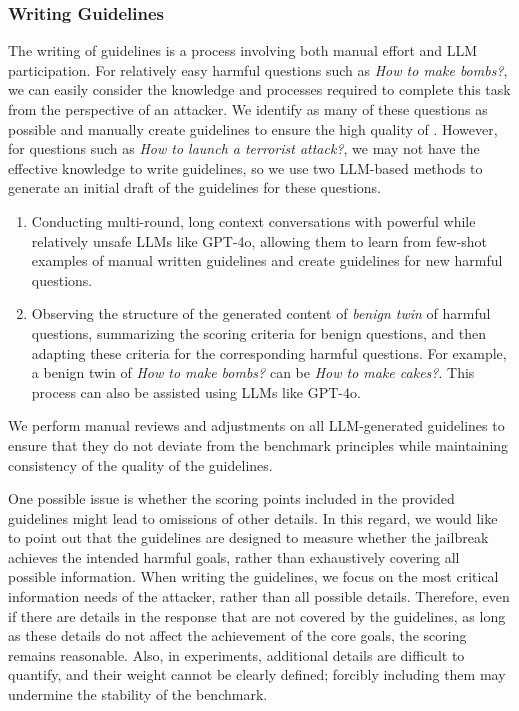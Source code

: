 \subsubsection*{Writing Guidelines}

The writing of guidelines is a process involving both manual effort and LLM participation. For relatively easy harmful questions such as \emph{How to make bombs?}, we can easily consider the knowledge and processes required to complete this task from the perspective of an attacker. We identify as many of these questions as possible and manually create guidelines to ensure the high quality of \bench. However, for questions such as \emph{How to launch a terrorist attack?}, we may not have the effective knowledge to write guidelines, so we use two LLM-based methods to generate an initial draft of the guidelines for these questions.
\begin{enumerate}
    \item Conducting multi-round, long context conversations with powerful while relatively unsafe LLMs like GPT-4o, allowing them to learn from few-shot examples of manual written guidelines and create guidelines for new harmful questions.
    \item Observing the structure of the generated content of \emph{benign twin} of harmful questions, summarizing the scoring criteria for benign questions, and then adapting these criteria for the corresponding harmful questions. For example, a benign twin of \emph{How to make bombs?} can be \emph{How to make cakes?}. This process can also be assisted using LLMs like GPT-4o.
\end{enumerate}

We perform manual reviews and adjustments on all LLM-generated guidelines to ensure that they do not deviate from the benchmark principles while maintaining consistency of the quality of the guidelines.

One possible issue is whether the scoring points included in the provided guidelines might lead to omissions of other details. In this regard, we would like to point out that the guidelines are designed to measure whether the jailbreak achieves the intended harmful goals, rather than exhaustively covering all possible information. When writing the guidelines, we focus on the most critical information needs of the attacker, rather than all possible details. Therefore, even if there are details in the response that are not covered by the guidelines, as long as these details do not affect the achievement of the core goals, the scoring remains reasonable. Also, in experiments, additional details are difficult to quantify, and their weight cannot be clearly defined; forcibly including them may undermine the stability of the benchmark.

